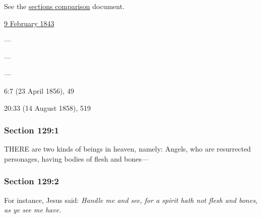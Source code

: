 		See the \href{https://drive.google.com/file/d/1goAvNz8jS4R8slYfMG_db55Ty2z_vmgK/view?usp=sharing}{sections comparison} document.
	
		\begin{compactdesc}
			\item[JSP] \hyperref[EMS-1843-JS-9-FEB-1843]{9 February 1843}
			\item[BC] ---
			\item[DC 1835] ---
			\item[DC 1844] ---
			\item[DN] 6:7 (23 April 1856), 49
			\item[MS] 20:33 (14 August 1858), 519
		\end{compactdesc}

	\subsubsection{Section 129:1} %
		\label{DC129-1}

		THERE are two kinds of beings in heaven, namely: Angels, who are resurrected personages, having bodies of flesh and bones---


	\subsubsection{Section 129:2} %
		\label{DC129-2}

		For instance, Jesus said: \textit{Handle me and see, for a spirit hath not flesh and bones, as ye see me have.}


